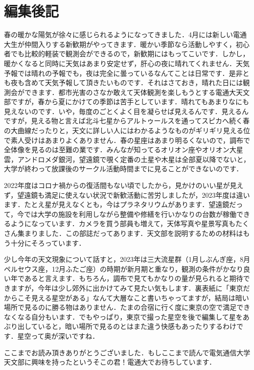\documentclass[supernova_2023]{subfiles}
\begin{document}
\chapter{編集後記}
\vspace{2\zw}
春の暖かな陽気が徐々に感じられるようになってきました．4月には新しい電通大生が仲間入りする新歓期がやってきます．暖かい季節なら活動しやすく，初心者でも比較的軽装で観測会ができるので，新歓期にはもってこいです．しかし，暖かくなると同時に天気はあまり安定せず，肝心の夜に晴れてくれません．天気予報では晴れの予報でも，夜は完全に曇っているなんてことは日常です．是非とも夜も含めて天気予報して頂きたいものです．それはさておき，晴れた日には観測会ができます．都市光害のさなか敢えて天体観測を楽しもうとする電通大天文部ですが，春から夏にかけての季節は苦手としています．晴れてもあまりなにも見えないのです．いや，毎度のごとくよく目を凝らせば見えるんです．見えるんですが，見える物と言えば北斗七星からアルトゥールスを通ってスピカへ続く春の大曲線だったりと，天文に詳しい人にはわかるようなものがギリギリ見える位で素人受けはあまりよくありません．春の星座はあまり明るくないので，調布で全体像を見るのは至難の業です．みんなが知ってるオリオン座やオリオン大星雲，アンドロメダ銀河，望遠鏡で覗く定番の土星や木星は全部夏以降でないと，大学が終わって放課後のサークル活動時間までに見ることができないのです．

2022年度はコロナ禍からの復活間もない頃でしたから，見かけのいい星が見えず，望遠鏡も満足に使えない状況で新歓活動に苦労しましたが，2023年度は違います．たとえ星が見えなくとも，今はプラネタリウムがあります．望遠鏡だって，今では大学の施設を利用しながら整備や修繕を行いかなりの台数が稼働できるようになっています．カメラを買う部員も増えて，天体写真や星景写真もたくさん集まりました．この部誌だってあります．天文部を説明するための材料はもう十分にそろっています．

少し今年の天文現象について話すと，2023年は三大流星群（1月しぶんぎ座，8月ペルセウス座，12月ふたご座）の時期が新月期と重なり，観測の条件がかなり良い年であると言えます．もちろん，調布で見てもかなりの量が見られると期待できますが，今年は少し郊外に出かけてみて見たい気もします．裏表紙に「東京だからこそ見える星空がある」なんて大層なこと書いちゃってますが，結局は暗い場所で見るのに勝る物はありません．たまの合宿に行く度に東京の空で満足できなくなる自分もいます．でもやっぱり，東京で撮った星空を後で編集して星をあぶり出していると，暗い場所で見るのとはまた違う快感もあったりするわけです．星空って奥が深いですね．

ここまでお読み頂きありがとうございました．もしここまで読んで電気通信大学天文部に興味を持ったというそこの君！電通大でお待ちしています．
\end{document}
